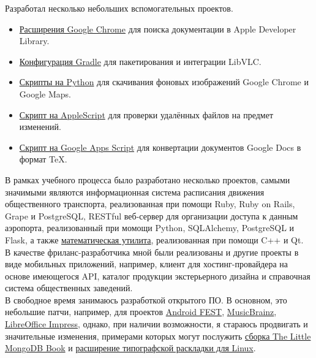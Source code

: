      Разработал несколько небольших вспомогательных проектов.

      \begin{itemize}

        \item \href{для://github.com/ming13/apple-developer-library-search-extensions}{Расширения Google Chrome}
          для поиска документации в Apple Developer Library.

        \item \href{https://github.com/ming13/libvlc-android}{Конфигурация Gradle}
          для пакетирования и интеграции LibVLC.

        \item \href{https://github.com/ming13/google-wallpaper-downloaders}{Скрипты на Python}
          для скачивания фоновых изображений Google Chrome и Google Maps.

        \item \href{https://github.com/ming13/watchdog}{Скрипт на AppleScript}
          для проверки удалённых файлов на предмет изменений.

        \item \href{https://github.com/ming13/gdoc2tex}{Скрипт на Google Apps Script}
          для конвертации документов Google Docs в формат \TeX.

      \end{itemize}

      В рамках учебного процесса было разработано несколько проектов,
      самыми значимыми являются
      информационная система расписания движения общественного транспорта,
      реализованная при помощи Ruby, Ruby on Rails, Grape и PostgreSQL,
      RESTful веб-сервер для организации доступа к данным аэропорта, реализованный
      при момощи Python, SQLAlchemy, PostgreSQL и Flask, а также
      \href{https://github.com/ming13/aequatio}{математическая утилита},
      реализованная при помощи C++ и Qt. \\

      В качестве фриланс-разработчика
      мной были реализованы и другие проекты в виде мобильных приложений,
      например, клиент для хостинг-провайдера на основе имеющегося API,
      каталог продукции экстерьерного дизайна и справочная система
      общественных заведений. \\

      В свободное время занимаюсь разработкой открытого ПО.
      В основном, это небольшие патчи, например, для проектов
      \href{https://github.com/square/fest-android/commits?author=ming13}{Android FEST},
      \href{https://github.com/jdamcd/musicbrainz-android/commits?author=ming13}{MusicBrainz},
      \href{https://gerrit.libreoffice.org/#/q/owner:%22Artur+Dryomov%22+status:closed,n,z}{LibreOffice Impress},
      однако, при наличии возможности, я стараюсь продвигать и значительные изменения, примерами
      которых могут послужить
      \href{https://github.com/karlseguin/the-little-mongodb-book/pull/16}{сборка The Little MongoDB Book} и
      \href{http://cgit.freedesktop.org/xkeyboard-config/plain/symbols/typo}{расширение типографской раскладки для Linux}.


